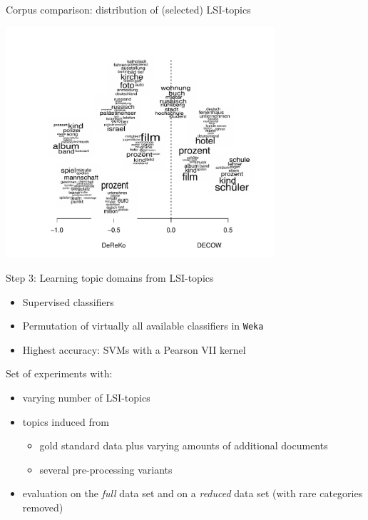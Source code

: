 \documentclass{beamer}
\begin{document}
\begin{frame}
  {Corpus comparison: distribution of (selected) LSI-topics}
  \begin{center}
    \includegraphics[width=0.75\textwidth]{graphics/topics-logratios2bw}
  \end{center}
\end{frame}




\begin{frame}
  {Step 3: Learning topic domains from LSI-topics}
  \begin{itemize}
    \item Supervised classifiers
    \item Permutation of virtually all available classifiers in \texttt{Weka}\\ \citep{HallWitten2011}
    \item Highest accuracy: SVMs with a Pearson VII kernel\\ \citep{UstunEa2006}
  \end{itemize}
  \vspace{.5cm}
\pause
Set of experiments with:
  \begin{itemize}
    \item varying number of LSI-topics
    \item topics induced from
      \begin{itemize} 
        \item gold standard data plus varying amounts of additional documents
        \item several pre-processing variants
      \end{itemize}
    \item evaluation on the \textit{full} data set and on a \textit{reduced} data set (with rare categories removed)
  \end{itemize}
\end{frame}
\end{document}
